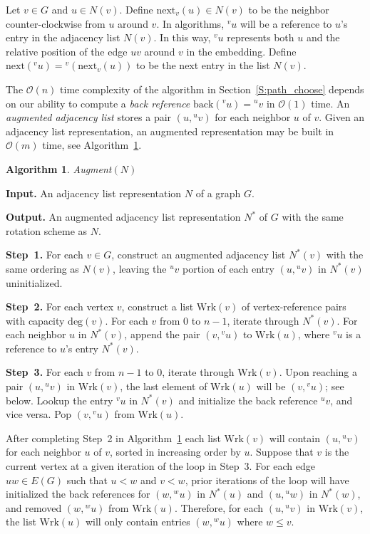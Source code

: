 \documentclass[12pt,letterpaper]{article}
\newcommand{\adj}[2]{{}^{#1}{#2}}
\newcommand{\nxt}{\text{next}}
\newcommand{\bck}{\text{back}}
\theoremstyle{plain}
\theoremstyle{definition}
\theoremstyle{break}
\newtheorem{algorithm}[lemma]{Algorithm}     %
\newcommand{\defterm}[1]{\emph{#1}} %
\begin{document}
Let $v\in G$ and $u\in N(v)$. Define $\nxt_v(u)\in N(v)$ to be
the neighbor counter-clockwise from $u$ around $v$.
In algorithms,
$\adj{v}{u}$ will be a reference to $u$'s entry in the
adjacency list $N(v)$. In this way,
$\adj{v}{u}$ represents both $u$ and the relative position of
the edge $uv$ around $v$ in the embedding.
Define $\nxt(\adj{v}{u})=\adj{v}{(\nxt_v(u))}$ to be the next
entry in the list $N(v)$.

The $\mathcal{O}(n)$ time complexity of the algorithm
in Section~\ref{S:path_choose} depends on our ability
to compute a \defterm{back reference}
$\bck(\adj{v}{u})=\adj{u}{v}$ in $\mathcal{O}(1)$ time.
An \defterm{augmented adjacency list}
stores a pair $(u,\adj{u}{v})$ for each neighbor $u$ of $v$.
Given an adjacency list representation, an augmented
representation may be built in $\mathcal{O}(m)$ time, see
Algorithm~\ref{A:augment}.

\begin{algorithm}\label{A:augment} \emph{Augment}$(N)$

\textbf{Input.} An adjacency list representation $N$ of a graph $G$.

\textbf{Output.} An augmented adjacency list representation $N^*$ of
$G$ with the same rotation scheme as $N$.

\textbf{Step~1.} For each $v\in G$, construct an
augmented adjacency list $N^*(v)$
with the same ordering as $N(v)$, leaving the
$\adj{u}{v}$ portion of each entry $(u,\adj{u}{v})$ in $N^*(v)$
uninitialized.

\textbf{Step~2.} For each vertex $v$, construct a list $\text{Wrk}(v)$
of vertex-reference pairs with capacity $\text{deg}(v)$. For each $v$ from
$0$ to $n-1$, iterate through
$N^*(v)$. For each neighbor $u$ in $N^*(v)$, append the pair
$(v,\adj{v}{u})$ to $\text{Wrk}(u)$,
where $\adj{v}{u}$ is a reference to $u$'s entry $N^*(v)$.

\textbf{Step~3.} For each $v$ from $n-1$ to $0$, iterate through
$\text{Wrk}(v)$. Upon reaching a pair $(u,\adj{u}{v})$ in
$\text{Wrk}(v)$, the
last element of $\text{Wrk}(u)$ will be $(v,\adj{v}{u})$;
see below. Lookup the entry $\adj{v}{u}$ in $N^*(v)$ and
initialize the back reference $\adj{u}{v}$, and vice versa.
Pop $(v,\adj{v}{u})$ from $\text{Wrk}(u)$.
\end{algorithm}

After completing Step~2 in Algorithm~\ref{A:augment} each list
$\text{Wrk}(v)$ will contain
$(u,\adj{u}{v})$ for each neighbor $u$ of $v$, sorted in increasing
order by $u$.
Suppose that $v$ is the current vertex at a given iteration of
the loop in Step~3. For each edge $uw\in E(G)$ such that
$u<w$ and $v<w$, prior iterations of the loop will have initialized the
back references for $(w, \adj{w}{u})$ in $N^*(u)$ and $(u, \adj{u}{w})$ in
$N^*(w)$, and removed $(w,\adj{w}{u})$ from $\text{Wrk}(u)$. Therefore, for
each $(u,\adj{u}{v})$ in
$\text{Wrk}(v)$, the list $\text{Wrk}(u)$ will only contain entries
$(w,\adj{w}{u})$ where $w\le v$.
\end{document}

